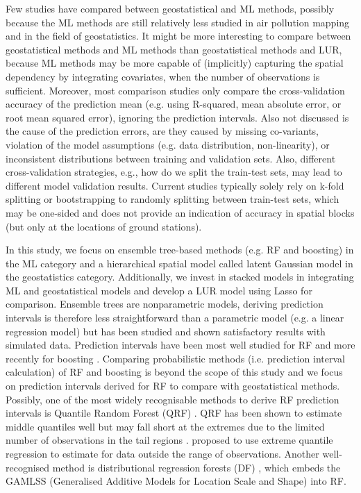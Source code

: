 \documentclass{article}
\begin{document}
Few studies have compared between geostatistical and ML methods, possibly because the ML methods are still relatively less studied in air pollution mapping and in the field of geostatistics. It might be more interesting to compare between geostatistical methods and ML methods than geostatistical methods and LUR, because ML methods may be more capable of  (implicitly) capturing the spatial dependency by integrating covariates, when the number of observations is sufficient. Moreover, most comparison studies only compare the cross-validation accuracy of the prediction mean (e.g. using R-squared, mean absolute error, or root mean squared error), ignoring the prediction intervals. Also not discussed is the cause of the prediction errors, are they caused by missing co-variants, violation of the model assumptions (e.g. data distribution, non-linearity), or inconsistent distributions between training and validation sets. Also, different cross-validation strategies, e.g., how do we split the train-test sets, may lead to different model validation results. Current studies typically solely rely on k-fold splitting \citep{kerckhoffs2019performance,larkin2017global,REN2020105827} or bootstrapping \citep{luglobal} to randomly splitting between train-test sets, which may be one-sided and does not provide an indication of accuracy in spatial blocks (but only at the locations of ground stations). 

In this study, we focus on ensemble tree-based methods (e.g. RF and boosting) in the ML category and a hierarchical spatial model \citep{lindgren2015bayesian, blangiardo2015spatial,moraga2019} called latent Gaussian model in the geostatistics category. Additionally, we invest in stacked models in integrating ML and geostatistical models and develop a LUR model using Lasso for comparison.  
Ensemble trees are nonparametric models, deriving prediction intervals is therefore less straightforward than a parametric model (e.g. a linear regression model) but has been studied and shown satisfactory results with simulated data. Prediction intervals have been most well studied for RF \citep{meinshausen2006quantile,wager2014confidence,stasinopoulos2007generalized,alakus2021rfpredinterval} and more recently for boosting \citep{duan2020ngboost,velthoen2021gradient}. Comparing probabilistic methods (i.e. prediction interval calculation) of RF and boosting is beyond the scope of this study and we focus on prediction intervals derived for RF to compare with geostatistical methods. Possibly, one of the most widely recognisable methods to derive RF prediction intervals is Quantile Random Forest (QRF) \citep{meinshausen2006quantile}. QRF has been shown to estimate middle quantiles well but may fall short at the extremes due to the limited number of observations in the tail regions \citep{velthoen2021gradient}. \cite{velthoen2021gradient} proposed to use extreme quantile regression to estimate for data outside the range of observations. Another well-recognised method is distributional regression forests (DF) \citep{schlosser2019distributional}, which embeds the GAMLSS (Generalised Additive Models for Location Scale and Shape) \citep{stasinopoulos2007generalized} into RF.  
\end{document}
